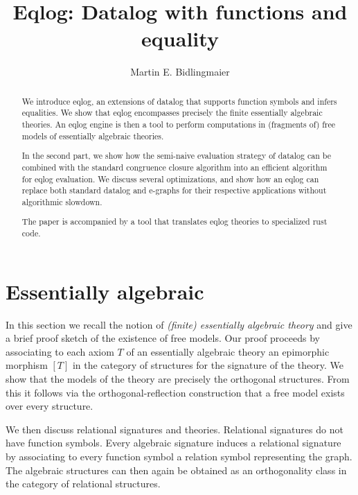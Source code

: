 \documentclass[a4paper]{article}
\theoremstyle{remark}
\theoremstyle{definition}
\begin{document}
\title{Eqlog: Datalog with functions and equality}

\author{Martin E. Bidlingmaier}

\date{}

\maketitle

\begin{abstract}
  We introduce eqlog, an extensions of datalog that supports function symbols and infers equalities.
  We show that eqlog encompasses precisely the finite essentially algebraic theories.
  An eqlog engine is then a tool to perform computations in (fragments of) free models of essentially algebraic theories.

  In the second part, we show how the semi-naive evaluation strategy of datalog can be combined with the standard congruence closure algorithm into an efficient algorithm for eqlog evaluation.
  We discuss several optimizations, and show how an eqlog can replace both standard datalog and e-graphs for their respective applications without algorithmic slowdown.

  The paper is accompanied by a tool that translates eqlog theories to specialized rust code.
\end{abstract}

\section{
  Essentially algebraic
}

In this section we recall the notion of \emph{ (finite) essentially algebraic theory } and give a brief proof sketch of the existence of free models.
Our proof proceeds by associating to each axiom $T$ of an essentially algebraic theory an epimorphic morphism $[T]$ in the category of structures for the signature of the theory.
We show that the models of the theory are precisely the orthogonal structures.
From this it follows via the orthogonal-reflection construction that a free model exists over every structure.

We then discuss relational signatures and theories.
Relational signatures do not have function symbols.
Every algebraic signature induces a relational signature by associating to every function symbol a relation symbol representing the graph.
The algebraic structures can then again be obtained as an orthogonality class in the category of relational structures.
\end{document}
